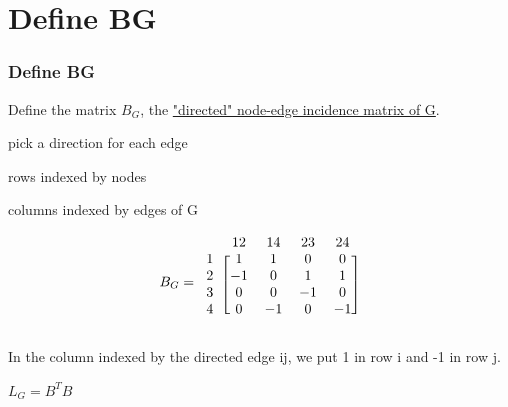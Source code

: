 \documentclass{beamer}
\begin{document}
\section{Define BG}
\begin{frame}
\frametitle{\textbf{Define BG} }

Define the matrix $B_{G}$, the \underline{"directed" node-edge incidence matrix of G}.


pick a direction for each edge


rows indexed by nodes

columns indexed by edges of G

\[
    B_{G} = 
    \begin{blockarray}{ccccc}
        & 12  & 14 & 23 & 24 \\
    \begin{block}{c[cccc]}
    1   & 1  & 1  & 0  & 0  \\
    2   & -1 & 0  & 1  & 1  \\
    3   & 0  & 0  & -1 & 0  \\
    4   & 0  & -1 & 0  & -1 \\
    \end{block}
    \end{blockarray}\vspace*{-1.25\baselineskip}
\]

In the column indexed by the directed edge ij, we put 1 in row i and -1 in row j.

$L_{G} = B^{T}B$

\end{frame}

\end{document}
